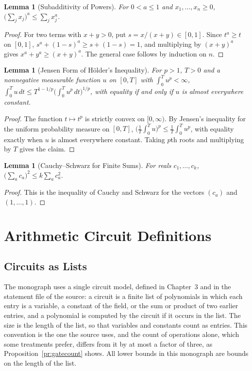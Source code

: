 \documentclass[11pt,letterpaper]{report}
\theoremstyle{plain}
\newtheorem{lemma}[theorem]{Lemma}
\theoremstyle{definition}
\theoremstyle{remark}
\begin{document}
\begin{lemma}[Subadditivity of Powers]\label{lem:subpower}
For $0<a\le1$ and $x_1,\dots,x_n\ge0$, $\bigl(\sum_jx_j\bigr)^a\le\sum_jx_j^a$.
\end{lemma}
\begin{proof}
For two terms with $x+y>0$, put $s=x/(x+y)\in[0,1]$. Since $t^a\ge t$ on $[0,1]$, $s^a+(1-s)^a\ge s+(1-s)=1$, and multiplying by $(x+y)^a$ gives $x^a+y^a\ge(x+y)^a$. The general case follows by induction on $n$.
\end{proof}

\begin{lemma}[Jensen Form of H\"older's Inequality]\label{lem:holder}
For $p>1$, $T>0$ and a nonnegative measurable function $u$ on $[0,T]$ with $\int_0^Tu^p<\infty$, $\int_0^Tu\,dt\le T^{1-1/p}\bigl(\int_0^Tu^p\,dt\bigr)^{1/p}$, with equality if and only if $u$ is almost everywhere constant.
\end{lemma}
\begin{proof}
The function $t\mapsto t^p$ is strictly convex on $[0,\infty)$. By Jensen's inequality for the uniform probability measure on $[0,T]$, $\bigl(\tfrac1T\int_0^Tu\bigr)^p\le\tfrac1T\int_0^Tu^p$, with equality exactly when $u$ is almost everywhere constant. Taking $p$th roots and multiplying by $T$ gives the claim.
\end{proof}

\begin{lemma}[Cauchy--Schwarz for Finite Sums]\label{lem:cs}
For reals $c_1,\dots,c_k$, $\bigl(\sum_ac_a\bigr)^2\le k\sum_ac_a^2$.
\end{lemma}
\begin{proof}
This is the inequality of Cauchy and Schwarz for the vectors $(c_a)$ and $(1,\dots,1)$.
\end{proof}

\chapter{Arithmetic Circuit Definitions}

\section{Circuits as Lists}

The monograph uses a single circuit model, defined in Chapter~3 and in the statement file of the source: a circuit is a finite list of polynomials in which each entry is a variable, a constant of the field, or the sum or product of two earlier entries, and a polynomial is computed by the circuit if it occurs in the list. The size is the length of the list, so that variables and constants count as entries. This convention is the one the source uses, and the count of operations alone, which some treatments prefer, differs from it by at most a factor of three, as Proposition~\ref{pr:gatecount} shows. All lower bounds in this monograph are bounds on the length of the list.
\end{document}
